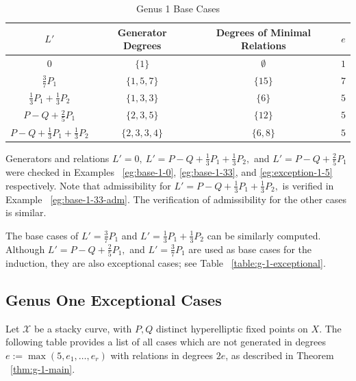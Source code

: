 \documentclass{amsart}
\theoremstyle{plain}
\theoremstyle{definition}
\theoremstyle{remark}
\numberwithin{equation}{section}
\newcommand\ssec{\subsection}
\newcommand\sx{\mathscr X}
\newcommand{\halfcan}{L}
\begin{document}
\begin{table}	
\begin{tabular}
{| c || c | c | c |}	
	\hline
	$\halfcan'$ & Generator Degrees & Degrees of Minimal Relations & $e$ \\
	\hline
	\hline
	$0$ & $\{1\}$ & $\emptyset$ & $1$ \\	\hline

	$\frac{3}{7} P_1$ & $\{1,5,7\}$ & $\{15\}$ & $7$ \\	\hline
	
	$\frac{1}{3} P_1 + \frac{1}{3} P_2$ & $\{1, 3, 3\}$ & $\{6\}$ & $5$ \\	\hline
	
	$P - Q + \frac{2}{5} P_1$ & $\{2, 3, 5\}$ & $\{12\}$ & $5$ \\	\hline
	
	$P - Q + \frac{1}{3} P_1 + \frac{1}{3}P_2$ & $\{2, 3, 3, 4\}$ & $\{6,8\}$ & $5$ \\	\hline
\end{tabular}	

\caption{Genus 1 Base Cases}
\label{table:g-1-base}
\end{table}

Generators and relations $L' = 0, \: L' = P-Q +\frac{1}{3}P_1 + \frac{1}{3}P_2,$ and $L' = P-Q + \frac{2}{5}P_1$ were checked in Examples ~\ref{eg:base-1-0}, \ref{eg:base-1-33}, and \ref{eg:exception-1-5} respectively. Note that admissibility for $L' = P-Q +\frac{1}{3}P_1 + \frac{1}{3}P_2,$ is verified in Example ~\ref{eg:base-1-33-adm}. The verification of admissibility for the other cases is similar.

The base cases of $L' = \frac{3}{7}P_1$ and $L' = \frac{1}{3}P_1 +\frac{1}{3}P_2$ can be similarly computed. Although $L' = P - Q + \frac{2}{5}P_1,$ and $L' = \frac{3}{7}P_1$ are used as base cases for the induction, they are also exceptional cases; see Table ~\ref{table:g-1-exceptional}.

\ssec{Genus One Exceptional Cases}
\label{ssec:g-1-exceptional}
Let $\sx$ be a stacky curve, with $P, Q$ distinct hyperelliptic
fixed points on $X$. The following table provides a list of all
cases which are not generated in degrees $e := \max(5, e_1, \ldots,
e_r)$ with relations in degrees $2e$, as described in Theorem
~\ref{thm:g-1-main}.
\end{document}
